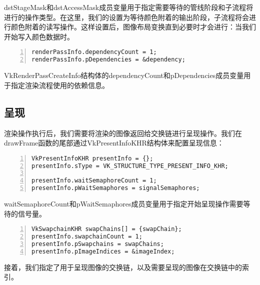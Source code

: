 \documentclass{ctexart}
\begin{document}
dstStageMask和dstAccessMask成员变量用于指定需要等待的管线阶段和子流程将进行的操作类型。在这里，我们的设置为等待颜色附着的输出阶段，子流程将会进行颜色附着的读写操作。这样设置后，图像布局变换直到必要时才会进行：当我们开始写入颜色数据时。

\begin{lstlisting}[language={[ANSI]C},keywordstyle=\color{blue!70},commentstyle=\color{red!50!green!50!blue!50},frame=shadowbox, rulesepcolor=\color{red!20!green!20!blue!20},basicstyle=\small,numbers=left, numberstyle=\tiny,breaklines=true]
renderPassInfo.dependencyCount = 1;
renderPassInfo.pDependencies = &dependency;
\end{lstlisting}

VkRenderPassCreateInfo结构体的dependencyCount和pDependencies成员变量用于指定渲染流程使用的依赖信息。

\subsection{呈现}

渲染操作执行后，我们需要将渲染的图像返回给交换链进行呈现操作。我们在drawFrame函数的尾部通过VkPresentInfoKHR结构体来配置呈现信息：

\begin{lstlisting}[language={[ANSI]C},keywordstyle=\color{blue!70},commentstyle=\color{red!50!green!50!blue!50},frame=shadowbox, rulesepcolor=\color{red!20!green!20!blue!20},basicstyle=\small,numbers=left, numberstyle=\tiny,breaklines=true]
VkPresentInfoKHR presentInfo = {};
presentInfo.sType = VK_STRUCTURE_TYPE_PRESENT_INFO_KHR;

presentInfo.waitSemaphoreCount = 1;
presentInfo.pWaitSemaphores = signalSemaphores;
\end{lstlisting}

waitSemaphoreCount和pWaitSemaphores成员变量用于指定开始呈现操作需要等待的信号量。

\begin{lstlisting}[language={[ANSI]C},keywordstyle=\color{blue!70},commentstyle=\color{red!50!green!50!blue!50},frame=shadowbox, rulesepcolor=\color{red!20!green!20!blue!20},basicstyle=\small,numbers=left, numberstyle=\tiny,breaklines=true]
VkSwapchainKHR swapChains[] = {swapChain};
presentInfo.swapchainCount = 1;
presentInfo.pSwapchains = swapChains;
presentInfo.pImageIndices = &imageIndex;
\end{lstlisting}

接着，我们指定了用于呈现图像的交换链，以及需要呈现的图像在交换链中的索引。
\end{document}
